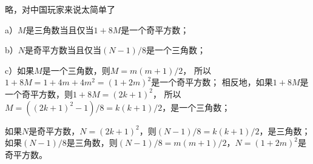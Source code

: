 \exercise 
略，对中国玩家来说太简单了

\exercise
a）$M$是三角数当且仅当\underline{$1+8M$}是一个奇平方数；\par
b）$N$是奇平方数当且仅当\underline{$(N-1)/8$}是一个三角数；\par
c）\proof 如果$M$是一个三角数，则$M=m(m+1)/2$，
所以$1+8M=1+4m+4m^2=(1+2m)^2$是一个奇平方数；
相反地，如果$1+8M$是一个奇平方数，则$1+8M=(2k+1)^2$，
所以$M=((2k+1)^2-1)/8=k(k+1)/2$，是一个三角数；\par
如果$N$是奇平方数，$N=(2k+1)^2$，则$(N-1)/8=k(k+1)/2$，是三角数；
如果$(N-1)/8$是三角数，则$(N-1)/8=m(m+1)/2$，$N=(1+2m)^2$是奇平方数。